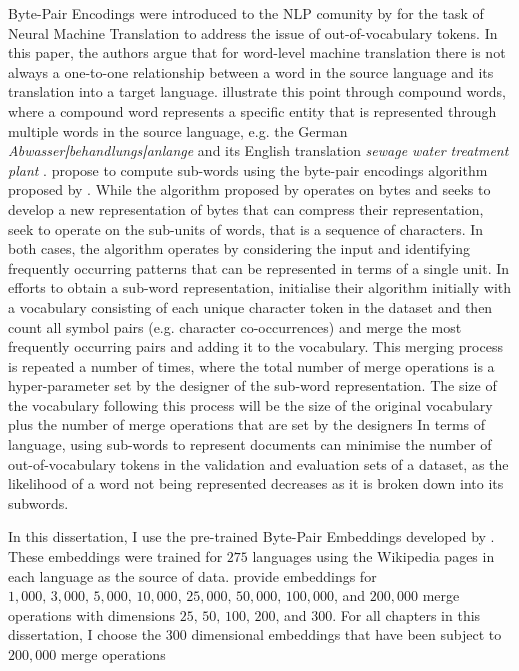 Byte-Pair Encodings were introduced to the NLP comunity by \cite{Sennrich:2016} for the task of Neural Machine Translation to address the issue of out-of-vocabulary tokens. In this paper, the authors argue that for word-level machine translation there is not always a one-to-one relationship between a word in the source language and its translation into a target language. \citet{Sennrich:2016} illustrate this point through compound words, where a compound word represents a specific entity that is represented through multiple words in the source language, e.g. the German \textit{Abwasser\textbf{|}behandlungs\textbf{|}anlange} and its English translation \textit{sewage water treatment plant} \citep{Sennrich:2016}.
\citet{Sennrich:2016} propose to compute sub-words using the byte-pair encodings algorithm proposed by \citet{Gage:1994}. While the algorithm proposed by \citet{Gage:1994} operates on bytes and seeks to develop a new representation of bytes that can compress their representation, \citet{Sennrich:2016} seek to operate on the sub-units of words, that is a sequence of characters. In both cases, the algorithm operates by considering the input and identifying frequently occurring patterns that can be represented in terms of a single unit.
In efforts to obtain a sub-word representation, \citet{Sennrich:2016} initialise their algorithm initially with a vocabulary consisting of each unique character token in the dataset and then count all symbol pairs (e.g. character co-occurrences) and merge the most frequently occurring pairs and adding it to the vocabulary. This merging process is repeated a number of times, where the total number of merge operations is a hyper-parameter set by the designer of the sub-word representation. The size of the vocabulary following this process will be the size of the original vocabulary plus the number of merge operations that are set by the designers \citep{Sennrich:2016}
In terms of language, using sub-words to represent documents can minimise the number of out-of-vocabulary tokens in the validation and evaluation sets of a dataset, as the likelihood of a word not being represented decreases as it is broken down into its subwords.

In this dissertation, I use the pre-trained Byte-Pair Embeddings developed by \citet{Heinzerling:2018}. These embeddings were trained for $275$ languages using the Wikipedia pages in each language as the source of data. \citet{Heinzerling:2018} provide embeddings for $1,000,\, 3,000,\, 5,000,\, 10,000,\, 25,000,\, 50,000,\, 100,000$, and $200,000$ merge operations with dimensions $25,\, 50,\, 100,\, 200$, and $300$. For all chapters in this dissertation, I choose the $300$ dimensional embeddings that have been subject to $200,000$ merge operations

